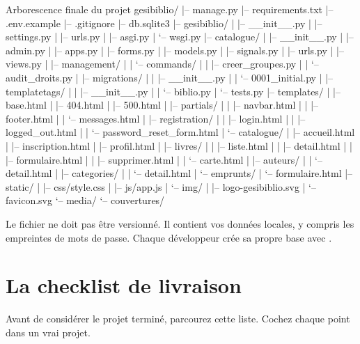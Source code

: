 \begin{codebox}[tree]{Arborescence finale du projet}
gesibiblio/
|-- manage.py
|-- requirements.txt
|-- .env.example
|-- .gitignore
|-- db.sqlite3
|-- gesibiblio/
|   |-- __init__.py
|   |-- settings.py
|   |-- urls.py
|   |-- asgi.py
|   `-- wsgi.py
|-- catalogue/
|   |-- __init__.py
|   |-- admin.py
|   |-- apps.py
|   |-- forms.py
|   |-- models.py
|   |-- signals.py
|   |-- urls.py
|   |-- views.py
|   |-- management/
|   |   `-- commands/
|   |       |-- creer_groupes.py
|   |       `-- audit_droits.py
|   |-- migrations/
|   |   |-- __init__.py
|   |   `-- 0001_initial.py
|   |-- templatetags/
|   |   |-- __init__.py
|   |   `-- biblio.py
|   `-- tests.py
|-- templates/
|   |-- base.html
|   |-- 404.html
|   |-- 500.html
|   |-- partials/
|   |   |-- navbar.html
|   |   |-- footer.html
|   |   `-- messages.html
|   |-- registration/
|   |   |-- login.html
|   |   |-- logged_out.html
|   |   `-- password_reset_form.html
|   `-- catalogue/
|       |-- accueil.html
|       |-- inscription.html
|       |-- profil.html
|       |-- livres/
|       |   |-- liste.html
|       |   |-- detail.html
|       |   |-- formulaire.html
|       |   |-- supprimer.html
|       |   `-- carte.html
|       |-- auteurs/
|       |   `-- detail.html
|       |-- categories/
|       |   `-- detail.html
|       `-- emprunts/
|           `-- formulaire.html
|-- static/
|   |-- css/style.css
|   |-- js/app.js
|   `-- img/
|       |-- logo-gesibiblio.svg
|       `-- favicon.svg
`-- media/
    `-- couvertures/
\end{codebox}

\begin{note}
Le fichier  ne doit pas être versionné. Il contient vos données
locales, y compris les empreintes de mots de passe. Chaque développeur crée sa
propre base avec .
\end{note}

\section{La checklist de livraison}

Avant de considérer le projet terminé, parcourez cette liste. Cochez chaque point
dans un vrai projet.

